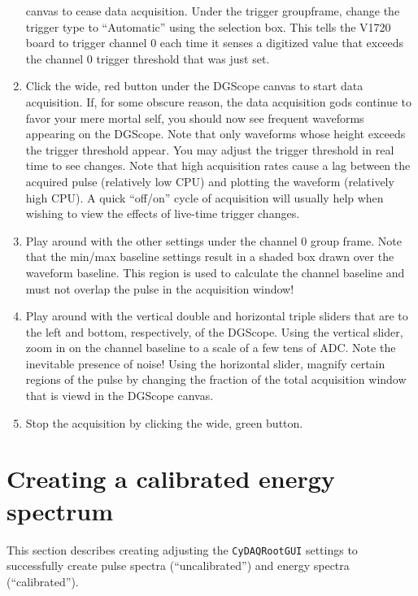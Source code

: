 \begin{enumerate}
{    canvas to cease data acquisition. Under the trigger groupframe,
    change the trigger type to ``Automatic'' using the selection
    box. This tells the V1720 board to trigger channel 0 each time it
    senses a digitized value that exceeds the channel 0 trigger
    threshold that was just set.}
  \item{Click the wide, red button under the DGScope canvas to start
    data acquisition. If, for some obscure reason, the data
    acquisition gods continue to favor your mere mortal self, you
    should now see frequent waveforms appearing on the DGScope. Note
    that only waveforms whose height exceeds the trigger threshold
    appear. You may adjust the trigger threshold in real time to see
    changes. Note that high acquisition rates cause a lag between the
    acquired pulse (relatively low CPU) and plotting the waveform
    (relatively high CPU). A quick ``off/on'' cycle of acquisition
    will usually help when wishing to view the effects of live-time
    trigger changes.}
  \item{Play around with the other settings under the channel 0 group
    frame. Note that the min/max baseline settings result in a shaded
    box drawn over the waveform baseline. This region is used to
    calculate the channel baseline and must not overlap the pulse in
    the acquisition window!}
  \item{Play around with the vertical double and horizontal triple
    sliders that are to the left and bottom, respectively, of the
    DGScope. Using the vertical slider, zoom in on the channel
    baseline to a scale of a few tens of ADC. Note the inevitable
    presence of noise! Using the horizontal slider, magnify certain
    regions of the pulse by changing the fraction of the total
    acquisition window that is viewd in the DGScope canvas.}
  \item{Stop the acquisition by clicking the wide, green button.}
\end{enumerate}

\section{Creating a calibrated  energy spectrum}
This section describes creating adjusting the \texttt{CyDAQRootGUI}
settings to successfully create pulse spectra (``uncalibrated'') and
energy spectra (``calibrated'').

